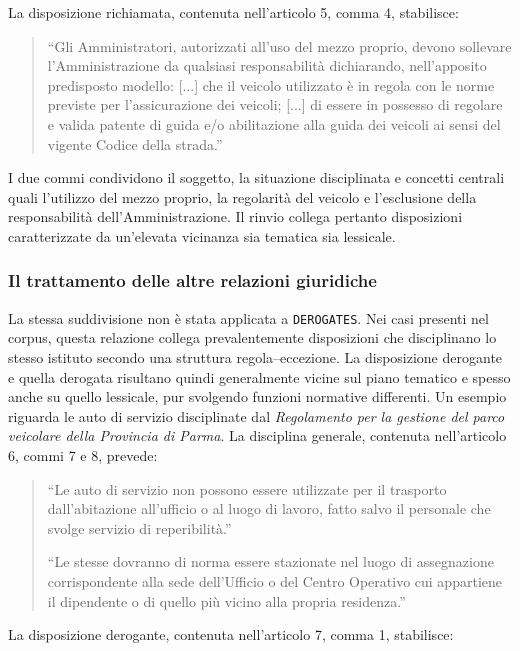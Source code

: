 La disposizione richiamata, contenuta nell'articolo 5, comma 4, stabilisce:

\begin{quote}
``Gli Amministratori, autorizzati all'uso del mezzo proprio, devono sollevare l'Amministrazione da qualsiasi responsabilità dichiarando, nell'apposito predisposto modello: [...] che il veicolo utilizzato è in regola con le norme previste per l'assicurazione dei veicoli; [...] di essere in possesso di regolare e valida patente di guida e/o abilitazione alla guida dei veicoli ai sensi del vigente Codice della strada.''
\end{quote}

I due commi condividono il soggetto, la situazione disciplinata e concetti centrali quali l'utilizzo del mezzo proprio, la regolarità del veicolo e l'esclusione della responsabilità dell'Amministrazione. Il rinvio collega pertanto disposizioni caratterizzate da un'elevata vicinanza sia tematica sia lessicale.


\subsubsection{Il trattamento delle altre relazioni giuridiche}

La stessa suddivisione non è stata applicata a \texttt{DEROGATES}. Nei casi presenti nel corpus, questa relazione collega prevalentemente disposizioni che disciplinano lo stesso istituto secondo una struttura regola--eccezione. La disposizione derogante e quella derogata risultano quindi generalmente vicine sul piano tematico e spesso anche su quello lessicale, pur svolgendo funzioni normative differenti.
Un esempio riguarda le auto di servizio disciplinate dal \emph{Regolamento per la gestione del parco veicolare della Provincia di Parma}. La disciplina generale, contenuta nell'articolo 6, commi 7 e 8, prevede:

\begin{quote}
``Le auto di servizio non possono essere utilizzate per il trasporto dall'abitazione all'ufficio o al luogo di lavoro, fatto salvo il personale che svolge servizio di reperibilità.''

``Le stesse dovranno di norma essere stazionate nel luogo di assegnazione corrispondente alla sede dell'Ufficio o del Centro Operativo cui appartiene il dipendente o di quello più vicino alla propria residenza.''
\end{quote}

La disposizione derogante, contenuta nell'articolo 7, comma 1, stabilisce:

